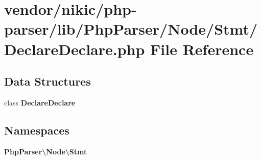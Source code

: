 \section{vendor/nikic/php-\/parser/lib/\+Php\+Parser/\+Node/\+Stmt/\+Declare\+Declare.php File Reference}
\label{_declare_declare_8php}
\subsection*{Data Structures}
\begin{DoxyCompactItemize}
\item 
class {\bf Declare\+Declare}
\end{DoxyCompactItemize}
\subsection*{Namespaces}
\begin{DoxyCompactItemize}
\item 
 {\bf Php\+Parser\textbackslash{}\+Node\textbackslash{}\+Stmt}
\end{DoxyCompactItemize}
